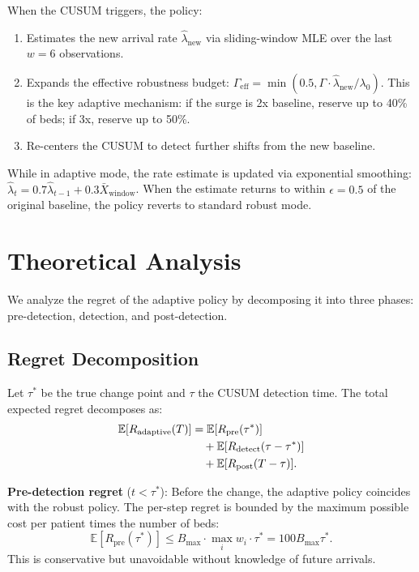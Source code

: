 \documentclass[11pt,twocolumn]{article}
\theoremstyle{plain}
\theoremstyle{definition}
\begin{document}
When the CUSUM triggers, the policy:
\begin{enumerate}
\item Estimates the new arrival rate $\hat{\lambda}_{\text{new}}$ via sliding-window MLE over the last $w = 6$ observations.
\item Expands the effective robustness budget: $\Gamma_{\text{eff}} = \min(0.5, \Gamma \cdot \hat{\lambda}_{\text{new}} / \lambda_0)$. This is the key adaptive mechanism: if the surge is 2x baseline, reserve up to 40\% of beds; if 3x, reserve up to 50\%.
\item Re-centers the CUSUM to detect further shifts from the new baseline.
\end{enumerate}

While in adaptive mode, the rate estimate is updated via exponential smoothing: $\hat{\lambda}_t = 0.7\hat{\lambda}_{t-1} + 0.3\bar{X}_{\text{window}}$. When the estimate returns to within $\epsilon = 0.5$ of the original baseline, the policy reverts to standard robust mode.

\section{Theoretical Analysis}
\label{sec:theory}

We analyze the regret of the adaptive policy by decomposing it into three phases: pre-detection, detection, and post-detection.

\subsection{Regret Decomposition}

Let $\tau^*$ be the true change point and $\tau$ the CUSUM detection time. The total expected regret decomposes as:
\begin{align}
\mathbb{E}[R_{\text{adaptive}}(T)] &= \mathbb{E}[R_{\text{pre}}(\tau^*)] \notag \\
&\quad + \mathbb{E}[R_{\text{detect}}(\tau - \tau^*)] \notag \\
&\quad + \mathbb{E}[R_{\text{post}}(T - \tau)].
\label{eq:decomp}
\end{align}

\textbf{Pre-detection regret} ($t < \tau^*$): Before the change, the adaptive policy coincides with the robust policy. The per-step regret is bounded by the maximum possible cost per patient times the number of beds:
\begin{equation}
\mathbb{E}[R_{\text{pre}}(\tau^*)] \le B_{\max} \cdot \max_i w_i \cdot \tau^* = 100 B_{\max} \tau^*.
\label{eq:pre-bound}
\end{equation}
This is conservative but unavoidable without knowledge of future arrivals.
\end{document}
